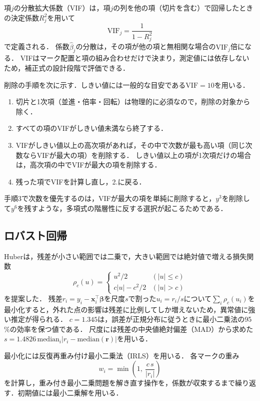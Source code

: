 \documentclass[11pt,a4paper]{ltjsarticle}
\begin{document}
項$j$の分散拡大係数（VIF）は，項$j$の列を他の項（切片を含む）で回帰したときの決定係数$R_j^2$を用いて
\begin{equation}
  \mathrm{VIF}_j=\frac{1}{1-R_j^2}
  \label{eq:vif}
\end{equation}
で定義される\cite{Marquardt1970}．
係数$\hat\beta_j$の分散は，その項が他の項と無相関な場合の$\mathrm{VIF}_j$倍になる．
VIFはマーク配置と項の組み合わせだけで決まり，測定値には依存しないため，補正式の設計段階で評価できる．

削除の手順を次に示す．しきい値には一般的な目安である$\mathrm{VIF}=10$を用いる．
\begin{enumerate}
  \item 切片と1次項（並進・倍率・回転）は物理的に必須なので，削除の対象から除く．
  \item すべての項のVIFがしきい値未満なら終了する．
  \item VIFがしきい値以上の高次項があれば，その中で次数が最も高い項（同じ次数ならVIFが最大の項）を削除する．
        しきい値以上の項が1次項だけの場合は，高次項の中でVIFが最大の項を削除する．
  \item 残った項でVIFを計算し直し，2.に戻る．
\end{enumerate}
手順3で次数を優先するのは，VIFが最大の項を単純に削除すると，$y^3$を削除して$y^6$を残すような，多項式の階層性に反する選択が起こるためである．

\subsection{ロバスト回帰}\label{sec:robust}

Huberは，残差が小さい範囲では二乗で，大きい範囲では絶対値で増える損失関数
\begin{equation}
  \rho_c(u)=
  \begin{cases}
    u^2/2 & (|u|\le c)\\
    c|u|-c^2/2 & (|u|>c)
  \end{cases}
  \label{eq:huber}
\end{equation}
を提案した\cite{Huber1964}．
残差$r_i=y_i-\bm x_i^\top\bm\beta$を尺度$s$で割った$u_i=r_i/s$について$\sum_i\rho_c(u_i)$を最小化すると，外れた点の影響は残差に比例してしか増えないため，異常値に強い推定が得られる．
$c=1.345$は，誤差が正規分布に従うときに最小二乗法の95\,\%の効率を保つ値である．
尺度には残差の中央値絶対偏差（MAD）から求めた$s=1.4826\,\mathrm{median}_i\left|r_i-\mathrm{median}(\bm r)\right|$を用いる．

最小化には反復再重み付け最小二乗法（IRLS）\cite{Holland1977}を用いる．
各マークの重み
\begin{equation}
  w_i=\min\left(1,\ \frac{c\,s}{|r_i|}\right)
  \label{eq:weight}
\end{equation}
を計算し，重み付き最小二乗問題を解き直す操作を，係数が収束するまで繰り返す．初期値には最小二乗解を用いる．
\end{document}
